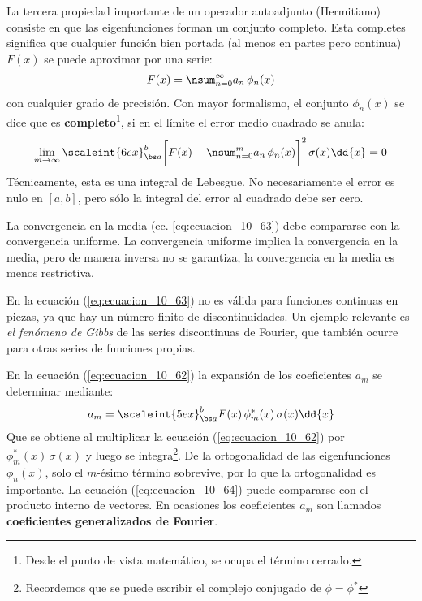 La tercera propiedad importante de un operador autoadjunto (Hermitiano) consiste en que las eigenfunciones forman un conjunto completo. Esta completes significa que cualquier función bien portada (al menos en partes pero continua) $F (x)$ se puede aproximar por una serie:
\begin{align}
F (x) = \nsum_{n=0}^{\infty} a_{n} \, \phi_{n} (x) 
\label{eq:ecuacion_10_62}
\end{align}
con cualquier grado de precisión. Con mayor formalismo, el conjunto $\phi_{n} (x)$ se dice que es \textbf{completo}\footnote{Desde el punto de vista matemático, se ocupa el término cerrado.}, si en el límite el error medio cuadrado se anula:
\begin{align}
\lim_{m \to \infty} \scaleint{6ex}_{\bs a}^{b} \bigg[ F (x) - \nsum_{n=0}^{m} a_{n} \, \phi_{n} (x) \bigg]^{2} \, \sigma (x) \dd{x} = 0
\label{eq:ecuacion_10_63}
\end{align}
Técnicamente, esta es una integral de Lebesgue. No necesariamente el error es nulo en $[a,b]$, pero sólo la integral del error al cuadrado debe ser cero.
\par
La convergencia en la media (ec. \ref{eq:ecuacion_10_63}) debe compararse con la convergencia uniforme. La convergencia uniforme implica la convergencia en la media, pero de manera inversa no se garantiza, la convergencia en la media es menos restrictiva.
\par
En la ecuación (\ref{eq:ecuacion_10_63}) no es válida para funciones continuas en piezas, ya que hay un número finito de discontinuidades. Un ejemplo relevante es \emph{el fenómeno de Gibbs} de las series discontinuas de Fourier, que también ocurre para otras series de funciones propias.
\par
En la ecuación (\ref{eq:ecuacion_10_62}) la expansión de los coeficientes $a_{m}$ se determinar mediante:
\begin{align}
a_{m} = \scaleint{5ex}_{\bs a}^{b} F(x) \, \phi_{m}^{*} (x) \, \sigma (x) \dd{x}
\label{eq:ecuacion_10_64}
\end{align}
Que se obtiene al multiplicar la ecuación (\ref{eq:ecuacion_10_62}) por $\phi_{m}^{*} (x) \, \sigma (x)$ y luego se integra\footnote{Recordemos que se puede escribir el complejo conjugado de $\overline{\phi} = \phi^{*}$}. De la ortogonalidad de las eigenfunciones  $\phi_{n}(x)$, solo el $m$-ésimo término sobrevive, por lo que la ortogonalidad es importante. La ecuación (\ref{eq:ecuacion_10_64}) puede compararse con el producto interno de vectores. En ocasiones los coeficientes $a_{m}$ son llamados \textbf{coeficientes generalizados de Fourier}.
